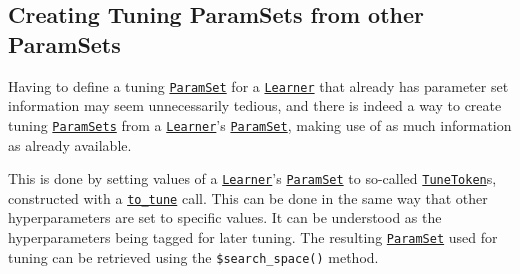 \documentclass[
]{scrbook}
\newenvironment{Shaded}{\begin{snugshade}}{\end{snugshade}}
\newcommand{\AttributeTok}[1]{\textcolor[rgb]{0.77,0.63,0.00}{#1}}
\newcommand{\CommentTok}[1]{\textcolor[rgb]{0.56,0.35,0.01}{\textit{#1}}}
\newcommand{\DecValTok}[1]{\textcolor[rgb]{0.00,0.00,0.81}{#1}}
\newcommand{\FunctionTok}[1]{\textcolor[rgb]{0.00,0.00,0.00}{#1}}
\newcommand{\NormalTok}[1]{#1}
\newcommand{\OtherTok}[1]{\textcolor[rgb]{0.56,0.35,0.01}{#1}}
\newcommand{\SpecialCharTok}[1]{\textcolor[rgb]{0.00,0.00,0.00}{#1}}
\newcommand{\StringTok}[1]{\textcolor[rgb]{0.31,0.60,0.02}{#1}}
\renewenvironment{Shaded} {\begin{snugshade}\small} {\end{snugshade}}
\begin{document}
\hypertarget{creating-tuning-paramsets-from-other-paramsets}{%
\subsection{Creating Tuning ParamSets from other ParamSets}\label{creating-tuning-paramsets-from-other-paramsets}}

Having to define a tuning \href{https://paradox.mlr-org.com/reference/ParamSet.html}{\texttt{ParamSet}} for a \href{https://mlr3.mlr-org.com/reference/Learner.html}{\texttt{Learner}} that already has parameter set information may seem unnecessarily tedious, and there is indeed a way to create tuning \href{https://paradox.mlr-org.com/reference/ParamSet.html}{\texttt{ParamSets}} from a \href{https://mlr3.mlr-org.com/reference/Learner.html}{\texttt{Learner}}'s \href{https://paradox.mlr-org.com/reference/ParamSet.html}{\texttt{ParamSet}}, making use of as much information as already available.

This is done by setting values of a \href{https://mlr3.mlr-org.com/reference/Learner.html}{\texttt{Learner}}'s \href{https://paradox.mlr-org.com/reference/ParamSet.html}{\texttt{ParamSet}} to so-called \href{https://paradox.mlr-org.com/reference/to_tune.html}{\texttt{TuneToken}}s, constructed with a \href{https://paradox.mlr-org.com/reference/to_tune.html}{\texttt{to\_tune}} call.
This can be done in the same way that other hyperparameters are set to specific values.
It can be understood as the hyperparameters being tagged for later tuning.
The resulting \href{https://paradox.mlr-org.com/reference/ParamSet.html}{\texttt{ParamSet}} used for tuning can be retrieved using the \texttt{\$search\_space()} method.

\begin{Shaded}
\end{Shaded}
\end{document}
